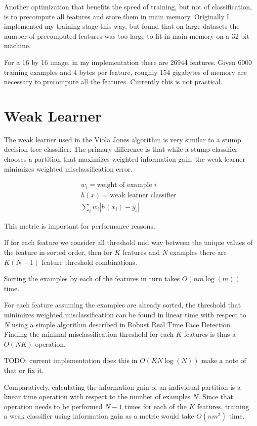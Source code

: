 \documentclass[11pt,twocolumn]{article}
\begin{document}
Another optimization that benefits the speed of training, but not of
classification, is to precompute all features and store them in main
memory. Originally I implemented my training stage this way, but found
that on large datasets the number of precomputed features was too
large to fit in main memory on a 32 bit machine.

For a 16 by 16 image, in my implementation there are 26944
features. Given 6000 training examples and 4 bytes per feature,
roughly 154 gigabytes of memory are necessary to precompute all the
features. Currently this is not practical.

\section{Weak Learner}
\label{sec:weaklearner}

The weak learner used in the Viola Jones algorithm is very similar to
a stump decision tree classifier. The primary difference is that while
a stump classifier chooses a partition that maximizes weighted
information gain, the weak learner minimizes weighted
misclassification error.

\begin{align*}
  w_i = \mbox{weight of example $i$}\\
  h(x) = \mbox{weak learner classifier}\\
  \sum_i w_i |h(x_i) - y_i|
\end{align*}

This metric is important for performance reasons.

If for each feature we consider all threshold mid way between the
unique values of the feature in sorted order, then for $K$ features and
$N$ examples there are $K (N - 1)$ feature threshold combinations.

Sorting the examples by each of the features in turn takes $O(n m
\log(m))$ time.

For each feature assuming the examples are already sorted, the
threshold that minimizes weighted misclassification can be found in
linear time with respect to $N$ using a simple algorithm described in
Robust Real Time Face Detection\cite{violajones2004}. Finding the
minimal misclassification threshold for each $K$ features is thus a
$O(N K)$ operation.

TODO: current implementation does this in $O(K N \log(N))$ make a note
of that or fix it.

Comparatively, calculating the information gain of an individual
partition is a linear time operation with respect to the number of
examples $N$. Since that operation needs to be performed $N - 1$ times
for each of the $K$ features, training a weak classifier using
information gain as a metric would take $O(n m^2)$ time.
\end{document}
